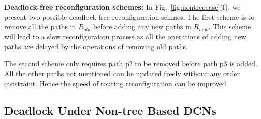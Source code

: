 \textbf{Deadlock-free reconfiguration schemes:} In Fig.~\ref{fig:nontreecase}(f), we present two possible deadlock-free reconfiguration schmes. The first scheme is to remove all the paths in $R_{old}$ before adding any new paths in $R_{new}$. This scheme will lead to a slow reconfiguration process as all the operations of adding new paths are delayed by the operations of removing old paths. 

The second scheme only requires path p2 to be removed before path p3 is added. All the other paths not mentioned can be updated freely without any order constraint. Hence the speed of routing reconfiguration can be improved.


\subsection{Deadlock Under Non-tree Based DCNs}\label{subsec:nontreecase}

